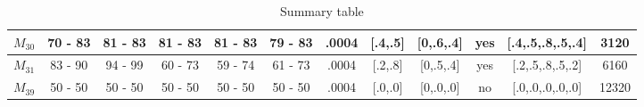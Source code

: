 \begin{table}[H]
{\begin{tabular}{|c|c|c|c|c|c|c|c|c|c|c|c|}
\rowcolor[HTML]{FFFFFF} 
$M_{30}$                                                                             & 70 - 83                                 & 81 - 83                                 & 81 - 83                                 & 81 - 83                                 & 79 - 83                                 & .0004                                                                                   & {[}.4,.5{]}                                                                                 & {[}0,.6,.4{]}                                                                               & yes                                                                                       & {[}.4,.5,.8,.5,.4{]}                                                                    & 3120                                                                                      \\ \hline
\rowcolor[HTML]{FFFFFF} 
$M_{31}$                                                                             & 83 - 90                                 & 94 - 99                                 & 60 - 73                                 & 59 - 74                                 & 61 - 73                                 & .0004                                                                                   & {[}.2,.8{]}                                                                                 & {[}0,.5,.4{]}                                                                               & yes                                                                                       & {[}.2,.5,.8,.5,.2{]}                                                                    & 6160                                                                                      \\ \hline
\rowcolor[HTML]{FFFFFF} 
$M_{39}$                                                                             & 50 - 50                                 & 50 - 50                                 & 50 - 50                                 & 50 - 50                                 & 50 - 50                                 & .0004                                                                                   & {[}.0,.0{]}                                                                                 & {[}0,.0,.0{]}                                                                               & no                                                                                        & {[}.0,.0,.0,.0,.0{]}                                                                    & 12320                                                                                     \\ \hline
\end{tabular}
}
\caption{Summary table}
\label{tab:summary_table_4}
\end{table}

